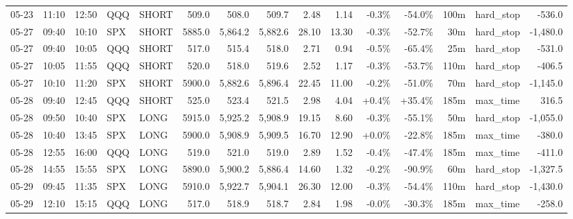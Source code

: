 \documentclass[11pt,a4paper,twoside]{article}
\begin{document}
\begin{landscape}
\begin{center}
\begin{longtable}{>{\color{txtmain}}l l l l l r r r r r r r r >{\color{txtmain}}l r}
05-23 & 11:10 & 12:50 & QQQ & SHORT & 509.0 & 508.0 & 509.7 & 2.48 & 1.14 & \textcolor{lossred}{-0.3\%} & \textcolor{lossred}{-54.0\%} & 100m & hard\_stop & \textcolor{lossred}{-536.0} \\
05-27 & 09:40 & 10:10 & SPX & SHORT & 5885.0 & 5,864.2 & 5,882.6 & 28.10 & 13.30 & \textcolor{lossred}{-0.3\%} & \textcolor{lossred}{-52.7\%} & 30m & hard\_stop & \textcolor{lossred}{-1,480.0} \\
05-27 & 09:40 & 10:05 & QQQ & SHORT & 517.0 & 515.4 & 518.0 & 2.71 & 0.94 & \textcolor{lossred}{-0.5\%} & \textcolor{lossred}{-65.4\%} & 25m & hard\_stop & \textcolor{lossred}{-531.0} \\
05-27 & 10:05 & 11:55 & QQQ & SHORT & 520.0 & 518.0 & 519.6 & 2.52 & 1.17 & \textcolor{lossred}{-0.3\%} & \textcolor{lossred}{-53.7\%} & 110m & hard\_stop & \textcolor{lossred}{-406.5} \\
05-27 & 10:10 & 11:20 & SPX & SHORT & 5900.0 & 5,882.6 & 5,896.4 & 22.45 & 11.00 & \textcolor{lossred}{-0.2\%} & \textcolor{lossred}{-51.0\%} & 70m & hard\_stop & \textcolor{lossred}{-1,145.0} \\
05-28 & 09:40 & 12:45 & QQQ & SHORT & 525.0 & 523.4 & 521.5 & 2.98 & 4.04 & \textcolor{wingreen}{+0.4\%} & \textcolor{wingreen}{+35.4\%} & 185m & max\_time & \textcolor{wingreen}{316.5} \\
05-28 & 09:50 & 10:40 & SPX & LONG & 5915.0 & 5,925.2 & 5,908.9 & 19.15 & 8.60 & \textcolor{lossred}{-0.3\%} & \textcolor{lossred}{-55.1\%} & 50m & hard\_stop & \textcolor{lossred}{-1,055.0} \\
05-28 & 10:40 & 13:45 & SPX & LONG & 5900.0 & 5,908.9 & 5,909.5 & 16.70 & 12.90 & \textcolor{wingreen}{+0.0\%} & \textcolor{lossred}{-22.8\%} & 185m & max\_time & \textcolor{lossred}{-380.0} \\
05-28 & 12:55 & 16:00 & QQQ & LONG & 519.0 & 521.0 & 519.0 & 2.89 & 1.52 & \textcolor{lossred}{-0.4\%} & \textcolor{lossred}{-47.4\%} & 185m & max\_time & \textcolor{lossred}{-411.0} \\
05-28 & 14:55 & 15:55 & SPX & LONG & 5890.0 & 5,900.2 & 5,886.4 & 14.60 & 1.32 & \textcolor{lossred}{-0.2\%} & \textcolor{lossred}{-90.9\%} & 60m & hard\_stop & \textcolor{lossred}{-1,327.5} \\
05-29 & 09:45 & 11:35 & SPX & LONG & 5910.0 & 5,922.7 & 5,904.1 & 26.30 & 12.00 & \textcolor{lossred}{-0.3\%} & \textcolor{lossred}{-54.4\%} & 110m & hard\_stop & \textcolor{lossred}{-1,430.0} \\
05-29 & 12:10 & 15:15 & QQQ & LONG & 517.0 & 518.9 & 518.7 & 2.84 & 1.98 & \textcolor{lossred}{-0.0\%} & \textcolor{lossred}{-30.3\%} & 185m & max\_time & \textcolor{lossred}{-258.0} \\

\end{longtable}
\end{center}
\end{landscape}
\end{document}
